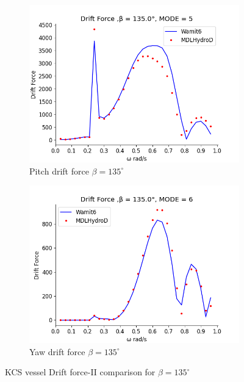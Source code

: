 \begin{figure}[H]
    \centering
    \begin{subfigure}[b]{0.49\textwidth}
        \includegraphics[width=\textwidth]{plots/kcs/drift/DrtFrc_9MODE_5.png}
        \caption{Pitch drift force $\beta = 135^{\circ}$}
    \end{subfigure}
    \begin{subfigure}[b]{0.49\textwidth}
        \includegraphics[width=\textwidth]{plots/kcs/drift/DrtFrc_9MODE_6.png}
        \caption{Yaw drift force $\beta = 135^{\circ}$}
    \end{subfigure}
    \caption{KCS vessel Drift force-II comparison for $\beta= 135^{\circ}$}
    \label{fig:kcs_drift_135_2}
\end{figure}
